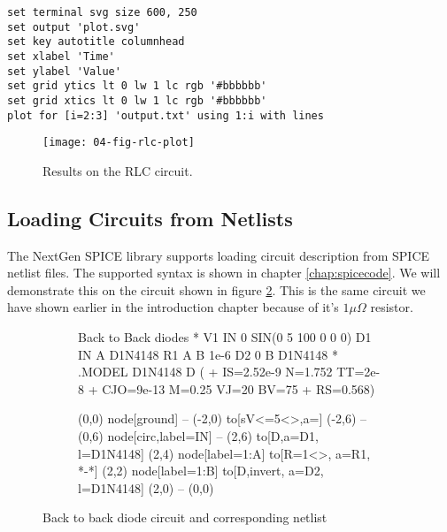 \begin{verbatim}
set terminal svg size 600, 250
set output 'plot.svg'
set key autotitle columnhead
set xlabel 'Time'
set ylabel 'Value'
set grid ytics lt 0 lw 1 lc rgb '#bbbbbb'
set grid xtics lt 0 lw 1 lc rgb '#bbbbbb'
plot for [i=2:3] 'output.txt' using 1:i with lines
\end{verbatim}


\begin{figure}[h]
	\centering
	\texttt{[image: 04-fig-rlc-plot]}
	\caption{Results on the RLC circuit.}
	\label{fig:userdocs:rlc-plot}
\end{figure}

\subsection{Loading Circuits from Netlists}

The NextGen SPICE library supports loading circuit description from SPICE netlist files. The supported syntax is shown in chapter \ref{chap:spicecode}. We will demonstrate this on the circuit shown in figure \ref{fig:back-to-back-circuit}. This is the same circuit we have shown earlier in the introduction chapter because of it's $1\mu\Omega$ resistor.

\begin{figure}[h]
	\begin{subfigure}{0.44\linewidth}
		\begin{spicecode}
Back to Back diodes
*
V1 IN 0 SIN(0 5 100 0 0 0)
D1 IN A D1N4148
R1 A B 1e-6
D2 0 B D1N4148
*
.MODEL D1N4148 D (
+ IS=2.52e-9 N=1.752 TT=2e-8
+ CJO=9e-13 M=0.25 VJ=20 BV=75
+ RS=0.568)
		\end{spicecode}
	\end{subfigure}
	\begin{subfigure}{0.55\linewidth}
	
		\centering
		\begin{circuitdev}
			(0,0) node[ground]{} -- (-2,0)
			to[sV<=5<\volt>,a=] (-2,6) -- (0,6) node[circ,label=IN]{} -- (2,6)
			to[D,a=D1, l=D1N4148] (2,4) node[label=1:A]{} to[R=1<\micro\ohm>, a=R1, *-*] (2,2) node[label=1:B]{} to[D,invert, a=D2, l=D1N4148] (2,0) -- (0,0)
		\end{circuitdev}
	\end{subfigure}
	\caption{Back to back diode circuit and corresponding netlist}
	\label{fig:back-to-back-circuit}
\end{figure}


